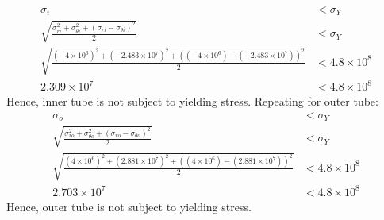\documentclass[11pt]{article}
\numberwithin{equation}{section}
\begin{document}
\begin{align}
    \sigma_i &< \sigma_Y\\
    \sqrt{\frac{\sigma_{ri}^2 + \sigma_{\theta i}^2 + \left(\sigma_{ri} - \sigma_{\theta i}\right)^2}{2}} &< \sigma_Y \label{eq:q2ii3}\\
    \sqrt{\frac{(-4\times10^6)^2 + (-2.483\times 10^7)^2 + \left((-4\times 10^6) - (-2.483\times 10^7)\right)^2}{2}} &< 4.8\times 10^8\\
    2.309\times 10^7 &< 4.8 \times 10^8
\end{align}
Hence, inner tube is not subject to yielding stress. Repeating for outer tube:
\begin{align}
    \sigma_o &< \sigma_Y\\
    \sqrt{\frac{\sigma_{ro}^2 + \sigma_{\theta o}^2 + \left(\sigma_{ro} - \sigma_{\theta o}\right)^2}{2}} &< \sigma_Y\\
    \sqrt{\frac{(4\times10^6)^2 + (2.881\times 10^7)^2 + \left((4\times 10^6) - (2.881\times 10^7)\right)^2}{2}} &< 4.8\times 10^8\\
    2.703\times 10^7 &< 4.8 \times 10^8
\end{align}
Hence, outer tube is not subject to yielding stress.
\end{document}

